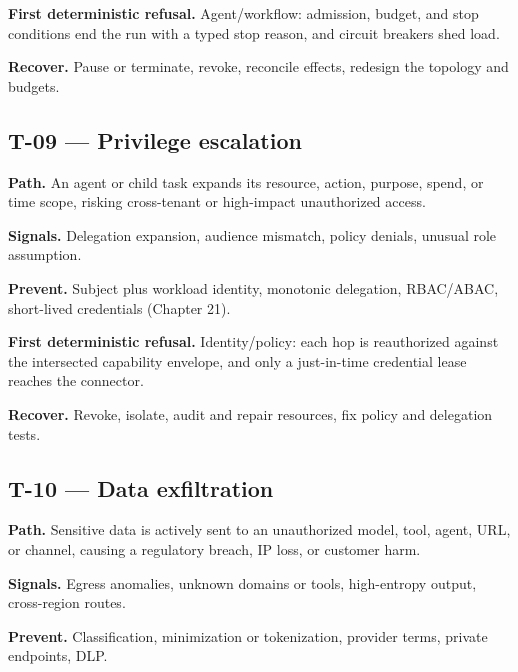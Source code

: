 \textbf{First deterministic refusal.} Agent/workflow: admission, budget, and stop conditions end the run with a typed stop reason, and circuit breakers shed load.\par

\textbf{Recover.} Pause or terminate, revoke, reconcile effects, redesign the topology and budgets.\par

\subsection{T-09 — Privilege escalation}

\textbf{Path.} An agent or child task expands its resource, action, purpose, spend, or time scope, risking cross-tenant or high-impact unauthorized access.\par

\textbf{Signals.} Delegation expansion, audience mismatch, policy denials, unusual role assumption.\par

\textbf{Prevent.} Subject plus workload identity, monotonic delegation, RBAC/ABAC, short-lived credentials (Chapter 21).\par

\textbf{First deterministic refusal.} Identity/policy: each hop is reauthorized against the intersected capability envelope, and only a just-in-time credential lease reaches the connector.\par

\textbf{Recover.} Revoke, isolate, audit and repair resources, fix policy and delegation tests.\par

\subsection{T-10 — Data exfiltration}

\textbf{Path.} Sensitive data is actively sent to an unauthorized model, tool, agent, URL, or channel, causing a regulatory breach, IP loss, or customer harm.\par

\textbf{Signals.} Egress anomalies, unknown domains or tools, high-entropy output, cross-region routes.\par

\textbf{Prevent.} Classification, minimization or tokenization, provider terms, private endpoints, DLP.\par

